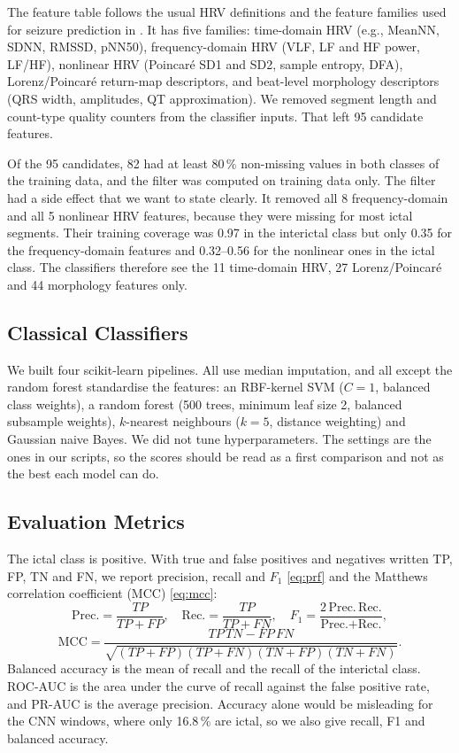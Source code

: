 \documentclass[conference,a4paper]{IEEEtran}
\begin{document}
The feature table follows the usual HRV definitions and the feature families
used for seizure prediction in \cite{Abtahi2025}. It has five families:
time-domain HRV (e.g., MeanNN, SDNN, RMSSD, pNN50), frequency-domain HRV
(VLF, LF and HF power, LF/HF), nonlinear HRV (Poincar\'e SD1 and SD2, sample
entropy, DFA), Lorenz/Poincar\'e return-map descriptors, and beat-level
morphology descriptors (QRS width, amplitudes, QT approximation). We removed
segment length and count-type quality counters from the classifier inputs.
That left 95 candidate features.

Of the 95 candidates, 82 had at least 80\,\% non-missing values in both
classes of the training data, and the filter was computed on training data
only. The filter had a side effect that we want to state clearly. It removed
all 8 frequency-domain and all 5 nonlinear HRV features, because they were
missing for most ictal segments. Their training coverage was 0.97 in the
interictal class but only 0.35 for the frequency-domain features and
0.32--0.56 for the nonlinear ones in the ictal class. The classifiers
therefore see the 11 time-domain HRV, 27 Lorenz/Poincar\'e and 44 morphology
features only.

\subsection{Classical Classifiers}
We built four scikit-learn pipelines. All use median imputation, and all
except the random forest standardise the features: an RBF-kernel SVM
($C=1$, balanced class weights), a random forest (500 trees, minimum leaf
size 2, balanced subsample weights), $k$-nearest neighbours ($k=5$, distance
weighting) and Gaussian naive Bayes. We did not tune hyperparameters. The
settings are the ones in our scripts, so the scores should be read as a first
comparison and not as the best each model can do.

\subsection{Evaluation Metrics}
The ictal class is positive. With true and false positives and negatives
written TP, FP, TN and FN, we report precision, recall and $F_1$
\eqref{eq:prf} and the Matthews correlation coefficient (MCC) \eqref{eq:mcc}:
\begin{equation}
\text{Prec.}=\frac{TP}{TP+FP},\quad
\text{Rec.}=\frac{TP}{TP+FN},\quad
F_1=\frac{2\,\text{Prec.}\,\text{Rec.}}{\text{Prec.}+\text{Rec.}},
\label{eq:prf}
\end{equation}
\begin{equation}
\text{MCC}=\frac{TP\,TN-FP\,FN}{\sqrt{(TP+FP)(TP+FN)(TN+FP)(TN+FN)}}.
\label{eq:mcc}
\end{equation}
Balanced accuracy is the mean of recall and the recall of the interictal
class. ROC-AUC is the area under the curve of recall against the false
positive rate, and PR-AUC is the average precision. Accuracy alone would be
misleading for the CNN windows, where only 16.8\,\% are ictal, so we also
give recall, F1 and balanced accuracy.
\end{document}
